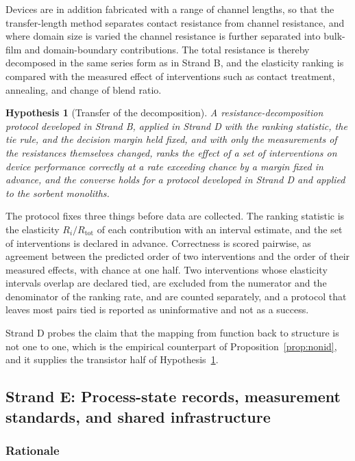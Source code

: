 \documentclass[11pt]{article}
\newtheorem{hypothesis}{Hypothesis}
\theoremstyle{definition}
\begin{document}
Devices are in addition fabricated with a range of channel lengths, so that the transfer-length method separates contact resistance from channel resistance, and where domain size is varied the channel resistance is further separated into bulk-film and domain-boundary contributions. The total resistance is thereby decomposed in the same series form as in Strand B, and the elasticity ranking is compared with the measured effect of interventions such as contact treatment, annealing, and change of blend ratio.

\begin{hypothesis}[Transfer of the decomposition]
\label{hyp:transfer}
A resistance-decomposition protocol developed in Strand B, applied in Strand D with the ranking statistic, the tie rule, and the decision margin held fixed, and with only the measurements of the resistances themselves changed, ranks the effect of a set of interventions on device performance correctly at a rate exceeding chance by a margin fixed in advance, and the converse holds for a protocol developed in Strand D and applied to the sorbent monoliths.
\end{hypothesis}

The protocol fixes three things before data are collected. The ranking statistic is the elasticity $R_i/R_{\mathrm{tot}}$ of each contribution with an interval estimate, and the set of interventions is declared in advance. Correctness is scored pairwise, as agreement between the predicted order of two interventions and the order of their measured effects, with chance at one half. Two interventions whose elasticity intervals overlap are declared tied, are excluded from the numerator and the denominator of the ranking rate, and are counted separately, and a protocol that leaves most pairs tied is reported as uninformative and not as a success.

Strand D probes the claim that the mapping from function back to structure is not one to one, which is the empirical counterpart of Proposition~\ref{prop:nonid}, and it supplies the transistor half of Hypothesis~\ref{hyp:transfer}.

\subsection{Strand E: Process-state records, measurement standards, and shared infrastructure}

\subsubsection*{Rationale}
\end{document}
